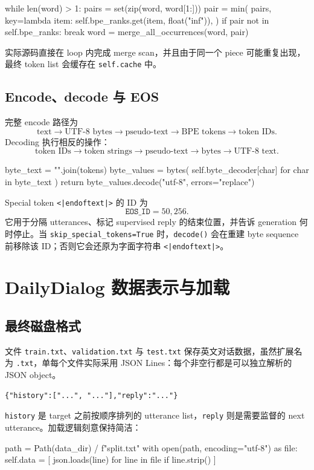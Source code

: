 \documentclass[12pt]{article}
\begin{document}
\begin{pythoncode}[label={lst:bpe-loop}]
while len(word) > 1:
    pairs = set(zip(word, word[1:]))
    pair = min(
        pairs,
        key=lambda item: self.bpe_ranks.get(item, float("inf")),
    )
    if pair not in self.bpe_ranks:
        break
    word = merge_all_occurrences(word, pair)
\end{pythoncode}
实际源码直接在 loop 内完成 merge scan，并且由于同一个 piece 可能重复出现，最终 token list 会缓存在 \texttt{self.cache} 中。

\subsection{Encode、decode 与 EOS}

完整 encode 路径为
\begin{equation}
\text{text}
\rightarrow \text{UTF-8 bytes}
\rightarrow \text{pseudo-text}
\rightarrow \text{BPE tokens}
\rightarrow \text{token IDs}.
\end{equation}
Decoding 执行相反的操作：
\begin{equation}
\text{token IDs}
\rightarrow \text{token strings}
\rightarrow \text{pseudo-text}
\rightarrow \text{bytes}
\rightarrow \text{UTF-8 text}.
\end{equation}

\begin{pythoncode}[label={lst:decode}]
byte_text = "".join(tokens)
byte_values = bytes(
    self.byte_decoder[char] for char in byte_text
)
return byte_values.decode("utf-8", errors="replace")
\end{pythoncode}

Special token \texttt{<|endoftext|>} 的 ID 为
\[
\texttt{EOS\_ID}=50{,}256.
\]
它用于分隔 utterances、标记 supervised reply 的结束位置，并告诉 generation 何时停止。当 \texttt{skip\_special\_tokens=True} 时，\texttt{decode()} 会在重建 byte sequence 前移除该 ID；否则它会还原为字面字符串 \texttt{<|endoftext|>}。

\section{DailyDialog 数据表示与加载}

\subsection{最终磁盘格式}

文件 \texttt{train.txt}、\texttt{validation.txt} 与 \texttt{test.txt} 保存英文对话数据，虽然扩展名为 \texttt{.txt}，单每个文件实际采用 JSON Lines：每个非空行都是可以独立解析的 JSON object。
\begin{verbatim}
{"history":["...", "..."],"reply":"..."}
\end{verbatim}
\texttt{history} 是 target 之前按顺序排列的 utterance list，\texttt{reply} 则是需要监督的 next utterance。加载逻辑刻意保持简洁：
\begin{pythoncode}[label={lst:data-load}]
path = Path(data_dir) / f"{split}.txt"
with open(path, encoding="utf-8") as file:
    self.data = [
        json.loads(line) for line in file if line.strip()
    ]
\end{pythoncode}
\end{document}
